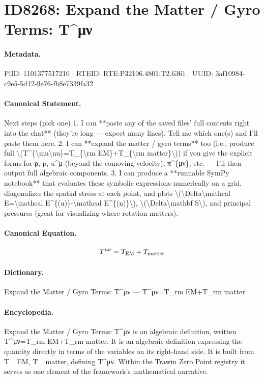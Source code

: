 \section*{ID8268: Expand the Matter / Gyro Terms: T\textasciicircum{}μν}
\paragraph{Metadata.}
PiID: 1101377517210 | RTEID: RTE:P32106.4801:T2.6361 | UUID: 3af10984-c9e5-5d12-9e76-fb8e7339fa32

\paragraph{Canonical Statement.}
Next steps (pick one) 1. I can **paste any of the saved files’ full contents right into the chat** (they’re long — expect many lines). Tell me which one(s) and I’ll paste them here. 2. I can **expand the matter / gyro terms** too (i.e., produce full \textbackslash{}(T\textasciicircum{}\{\textbackslash{}mu\textbackslash{}nu\}=T\_\{\textbackslash{}rm EM\}+T\_\{\textbackslash{}rm matter\}\textbackslash{})) if you give the explicit forms for ρ, p, u\textasciicircum{}μ (beyond the comoving velocity), π\textasciicircum{}\{μν\}, etc. — I’ll then output full algebraic components. 3. I can produce a **runnable SymPy notebook** that evaluates these symbolic expressions numerically on a grid, diagonalizes the spatial stress at each point, and plots \textbackslash{}(\textbackslash{}Delta\textbackslash{}mathcal E=\textbackslash{}mathcal E\textasciicircum{}\{(u)\}-\textbackslash{}mathcal E\textasciicircum{}\{(n)\}\textbackslash{}), \textbackslash{}(\textbackslash{}Delta\textbackslash{}mathbf S\textbackslash{}), and principal pressures (great for visualizing where rotation matters).

\paragraph{Canonical Equation.}
\[
T^{\mu\nu}=T_{\rm EM}+T_{\rm matter}
\]

\paragraph{Dictionary.}
Expand the Matter / Gyro Terms: T\textasciicircum{}μν — T\textasciicircum{}μν=T\_rm EM+T\_rm matter

\paragraph{Encyclopedia.}
Expand the Matter / Gyro Terms: T\textasciicircum{}μν is an algebraic definition, written T\textasciicircum{}μν=T\_rm EM+T\_rm matter. It is an algebraic definition expressing the quantity directly in terms of the variables on its right-hand side. It is built from T\_ EM, T\_ matter, defining T\textasciicircum{}μν. Within the Trawin Zero Point registry it serves as one element of the framework's mathematical narrative.
